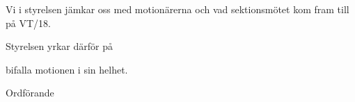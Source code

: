 \documentclass[../_main/handlingar.tex]{subfiles}
\begin{document}
\motionssvar
Vi i styrelsen jämkar oss med motionärerna och vad sektionsmötet kom fram till på VT/18.

Styrelsen yrkar därför på

\begin{attsatser}
    \att bifalla motionen i sin helhet.
\end{attsatser}


\begin{signatures}{1}
	\ist
	\signature{Daniel Bakic}{Ordförande}
\end{signatures}
\end{document}
